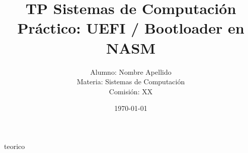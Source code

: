 \documentclass[a4paper,12pt]{article}
\title{\textbf{TP Sistemas de Computación}\\\large Práctico: UEFI / Bootloader en NASM}
\author{Alumno: Nombre Apellido \\ Materia: Sistemas de Computación \\ Comisión: XX}
\date{\today}
\begin{document}


\tableofcontents
\clearpage

 {teorico}
\end{document}
